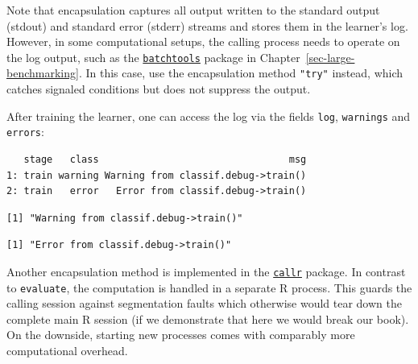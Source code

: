 Note that encapsulation captures all output written to the standard
output (stdout) and standard error (stderr) streams and stores them in
the learner's log. However, in some computational setups, the calling
process needs to operate on the log output, such as the
\href{https://cran.r-project.org/package=batchtools}{\texttt{batchtools}}
package in Chapter~\ref{sec-large-benchmarking}. In this case, use the
encapsulation method \texttt{"try"} instead, which catches signaled
conditions but does not suppress the output.

After training the learner, one can access the log via the fields
\texttt{log}, \texttt{warnings} and \texttt{errors}:

\begin{Shaded}
\begin{Highlighting}[]
\SpecialCharTok{$}
\end{Highlighting}
\end{Shaded}

\begin{verbatim}
   stage   class                                 msg
1: train warning Warning from classif.debug->train()
2: train   error   Error from classif.debug->train()
\end{verbatim}

\begin{Shaded}
\begin{Highlighting}[]
\SpecialCharTok{$}
\end{Highlighting}
\end{Shaded}

\begin{verbatim}
[1] "Warning from classif.debug->train()"
\end{verbatim}

\begin{Shaded}
\begin{Highlighting}[]
\SpecialCharTok{$}
\end{Highlighting}
\end{Shaded}

\begin{verbatim}
[1] "Error from classif.debug->train()"
\end{verbatim}

Another encapsulation method is implemented in the
\href{https://cran.r-project.org/package=callr}{\texttt{callr}} package.
In contrast to \texttt{evaluate}, the computation is handled in a
separate R process. This guards the calling session against segmentation
faults which otherwise would tear down the complete main R session (if
we demonstrate that here we would break our book). On the downside,
starting new processes comes with comparably more computational
overhead.

